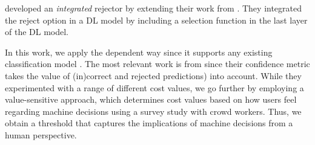 %
\citet{geifman2019reject} developed an \emph{integrated} rejector by extending their work from \citet{Geifman2017Selective}.
%
They integrated the reject option in a DL model by including a selection function in the last layer of the DL model.
%

In this work, we apply the dependent way since it supports any existing classification model \citep{hendrickx2021machine}.
%
The most relevant work is from \citet{de2000reject} since their confidence metric takes the value of (in)correct and rejected predictions) into account.
%
While they experimented with a range of different cost values, we go further by employing a value-sensitive approach, which determines cost values based on how users feel regarding machine decisions using a survey study with crowd workers.
%
Thus, we obtain a threshold that captures the implications of machine decisions from a human perspective.

